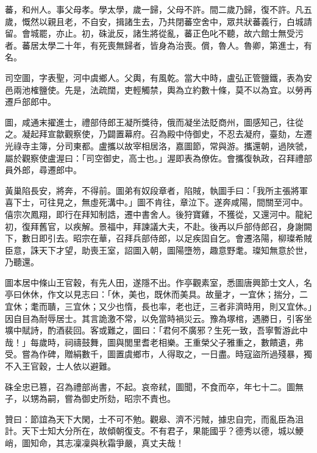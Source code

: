 \begin{pinyinscope}
 蕃，和州人。事父母孝。學太學，歲一歸，父母不許。間二歲乃歸，復不許。凡五歲，慨然以親且老，不自安，揖諸生去，乃共閉蕃空舍中，眾共狀蕃義行，白城請留。會城罷，亦止。初，硃泚反，諸生將從亂，蕃正色叱不聽，故六館士無受污者。蕃居太學二十年，有死喪無歸者，皆身為治喪。償，魯人。魯卿，第進士，有名。



 司空圖，字表聖，河中虞鄉人。父輿，有風乾。當大中時，盧弘正管鹽鐵，表為安邑兩池榷鹽使。先是，法疏闊，吏輕觸禁，輿為立約數十條，莫不以為宜。以勞再遷戶部郎中。



 圖，咸通末擢進士，禮部侍郎王凝所獎待，俄而凝坐法貶商州，圖感知己，往從之。凝起拜宣歙觀察使，乃闢置幕府。召為殿中侍御史，不忍去凝府，臺劾，左遷光祿寺主簿，分司東都。盧攜以故宰相居洛，嘉圖節，常與游。攜還朝，過陜虢，屬於觀察使盧渥曰：「司空御史，高士也。」渥即表為僚佐。會攜復執政，召拜禮部員外郎，尋遷郎中。



 黃巢陷長安，將奔，不得前。圖弟有奴段章者，陷賊，執圖手曰：「我所主張將軍喜下士，可往見之，無虛死溝中。」圖不肯往，章泣下。遂奔咸陽，間關至河中。僖宗次鳳翔，即行在拜知制誥，遷中書舍人。後狩寶雞，不獲從，又還河中。龍紀初，復拜舊官，以疾解。景福中，拜諫議大夫，不赴。後再以戶部侍郎召，身謝闕下，數日即引去。昭宗在華，召拜兵部侍郎，以足疾固自乞。會遷洛陽，柳璨希賊臣意，誅天下才望，助喪王室，詔圖入朝，圖陽墮笏，趣意野耄。璨知無意於世，乃聽還。



 圖本居中條山王官穀，有先人田，遂隱不出。作亭觀素室，悉圖唐興節士文人，名亭曰休休，作文以見志曰：「休，美也，既休而美具。故量才，一宜休；揣分，二宜休；耄而聵，三宜休；又少也惰，長也率，老也迂，三者非濟時用，則又宜休。」因自目為耐辱居士。其言詭激不常，以免當時禍災云。豫為塚棺，遇勝日，引客坐壙中賦詩，酌酒裴回。客或難之，圖曰：「君何不廣邪？生死一致，吾寧暫游此中哉！」每歲時，祠禱鼓舞，圖與閭里耆老相樂。王重榮父子雅重之，數饋遺，弗受。嘗為作碑，贈絹數千，圖置虞鄉市，人得取之，一日盡。時寇盜所過殘暴，獨不入王官穀，士人依以避難。



 硃全忠已篡，召為禮部尚書，不起。哀帝弒，圖聞，不食而卒，年七十二。圖無子，以甥為嗣，嘗為御史所劾，昭宗不責也。



 贊曰：節誼為天下大閑，士不可不勉。觀皋、濟不污賊，據忠自完，而亂臣為沮計。天下士知大分所在，故傾朝復支。不有君子，果能國乎？德秀以德，城以鯁峭，圖知命，其志凜凜與秋霜爭嚴，真丈夫哉！



\end{pinyinscope}